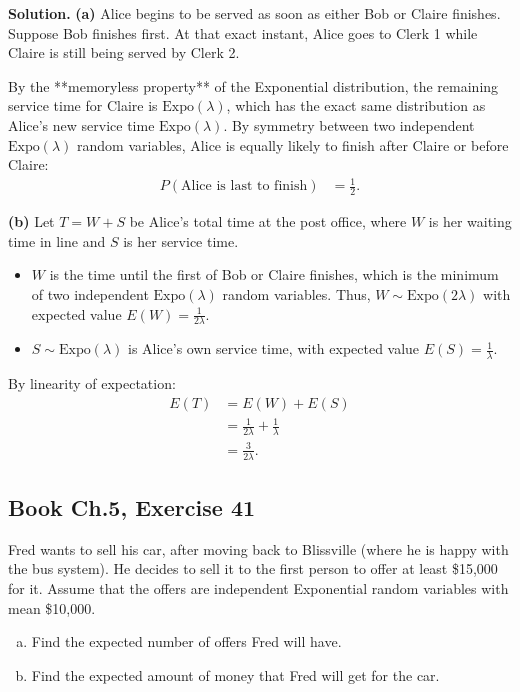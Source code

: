 \documentclass[11pt,a4paper]{article}
\begin{document}
\noindent \textbf{Solution.} \textbf{(a)} Alice begins to be served as soon as either Bob or Claire finishes. Suppose Bob finishes first. At that exact instant, Alice goes to Clerk 1 while Claire is still being served by Clerk 2. 

By the **memoryless property** of the Exponential distribution, the remaining service time for Claire is $\text{Expo}(\lambda)$, which has the exact same distribution as Alice's new service time $\text{Expo}(\lambda)$. By symmetry between two independent $\text{Expo}(\lambda)$ random variables, Alice is equally likely to finish after Claire or before Claire:
\begin{align*}
P(\text{Alice is last to finish}) &= \frac{1}{2}.
\end{align*}

\vspace{4pt}
\noindent \textbf{(b)} Let $T = W + S$ be Alice's total time at the post office, where $W$ is her waiting time in line and $S$ is her service time. 
\begin{itemize}
    \item $W$ is the time until the first of Bob or Claire finishes, which is the minimum of two independent $\text{Expo}(\lambda)$ random variables. Thus, $W \sim \text{Expo}(2\lambda)$ with expected value $E(W) = \frac{1}{2\lambda}$.
    \item $S \sim \text{Expo}(\lambda)$ is Alice's own service time, with expected value $E(S) = \frac{1}{\lambda}$.
\end{itemize}
By linearity of expectation:
\begin{align*}
E(T) &= E(W) + E(S) \\
&= \frac{1}{2\lambda} + \frac{1}{\lambda} \\
&= \frac{3}{2\lambda}.
\end{align*}

\vspace{10pt}
\subsection{Book Ch.5, Exercise 41}
\begin{tcolorbox}[title={Book Ch.5, Exercise 41}]
Fred wants to sell his car, after moving back to Blissville (where he is happy with the bus system). He decides to sell it to the first person to offer at least \$15,000 for it. Assume that the offers are independent Exponential random variables with mean \$10,000.
\begin{enumerate}[(a)]
\item Find the expected number of offers Fred will have.
\item Find the expected amount of money that Fred will get for the car.
\end{enumerate}
\end{tcolorbox}
\end{document}
